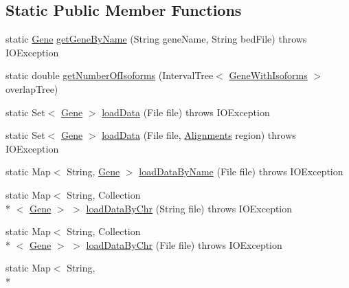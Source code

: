 \subsection*{Static Public Member Functions}
\begin{DoxyCompactItemize}
\item 
static \hyperlink{classumms_1_1core_1_1annotation_1_1_gene}{Gene} \hyperlink{classbroad_1_1pda_1_1annotation_1_1_b_e_d_file_parser_abd060b4376a538313b22991bf1eab8a9}{get\+Gene\+By\+Name} (String gene\+Name, String bed\+File)  throws I\+O\+Exception 
\item 
static double \hyperlink{classbroad_1_1pda_1_1annotation_1_1_b_e_d_file_parser_af57bdc6d25ab75ea4f495972b2915717}{get\+Number\+Of\+Isoforms} (Interval\+Tree$<$ \hyperlink{classbroad_1_1pda_1_1gene_1_1_gene_with_isoforms}{Gene\+With\+Isoforms} $>$ overlap\+Tree)
\item 
static Set$<$ \hyperlink{classumms_1_1core_1_1annotation_1_1_gene}{Gene} $>$ \hyperlink{classbroad_1_1pda_1_1annotation_1_1_b_e_d_file_parser_ad16b2d4ee806d6fd8741f45436a1676c}{load\+Data} (File file)  throws I\+O\+Exception
\item 
static Set$<$ \hyperlink{classumms_1_1core_1_1annotation_1_1_gene}{Gene} $>$ \hyperlink{classbroad_1_1pda_1_1annotation_1_1_b_e_d_file_parser_a9d2b6bab86001412f965b5cc93be29b2}{load\+Data} (File file, \hyperlink{classbroad_1_1pda_1_1datastructures_1_1_alignments}{Alignments} region)  throws I\+O\+Exception
\item 
static Map$<$ String, \hyperlink{classumms_1_1core_1_1annotation_1_1_gene}{Gene} $>$ \hyperlink{classbroad_1_1pda_1_1annotation_1_1_b_e_d_file_parser_a68ef8597a3f2809c759d3b9065b9896c}{load\+Data\+By\+Name} (File file)  throws I\+O\+Exception
\item 
static Map$<$ String, Collection\\*
$<$ \hyperlink{classumms_1_1core_1_1annotation_1_1_gene}{Gene} $>$ $>$ \hyperlink{classbroad_1_1pda_1_1annotation_1_1_b_e_d_file_parser_a4b0a06217b7b942ca4432dec71d47e7a}{load\+Data\+By\+Chr} (String file)  throws I\+O\+Exception
\item 
static Map$<$ String, Collection\\*
$<$ \hyperlink{classumms_1_1core_1_1annotation_1_1_gene}{Gene} $>$ $>$ \hyperlink{classbroad_1_1pda_1_1annotation_1_1_b_e_d_file_parser_a33bb3fba62fc200b7200b8510b2eb5c1}{load\+Data\+By\+Chr} (File file)  throws I\+O\+Exception
\item 
static Map$<$ String, \\*

\end{DoxyCompactItemize}
